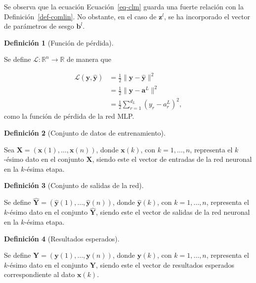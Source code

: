 \documentclass[
  us-letterpaper,
]{scrreprt}
\theoremstyle{plain}
\theoremstyle{definition}
\theoremstyle{plain}
\theoremstyle{definition}
\newtheorem{definition}{Definición}[chapter]
\theoremstyle{remark}
\begin{document}
Se observa que la ecuación Ecuación~\ref{eq-clm} guarda una fuerte
relación con la Definición~\ref{def-comlin}. No obstante, en el caso de
\(\mathbf{z}^l\), se ha incorporado el vector de parámetros de sesgo
\(\mathbf{b}^l\).

\begin{definition}[Función de
pérdida]\protect\hypertarget{def-fperdida}{}\label{def-fperdida}

Se define \(\mathcal L: \mathbb{R}^n \rightarrow \mathbb{R}\) de manera
que

\[\begin{split}\mathcal L(\mathbf y,\mathbf{\hat{y}}) &= \frac{1}{2}\|\mathbf y - \mathbf{\hat{y}}\|^2\\ &= \frac{1}{2} \|\mathbf y - \mathbf a^L\|^2\\ &= \frac{1}{2} \sum_{r=1}^{d_L} (y_r - a_r^L)^2,\end{split}\]
como la función de pérdida de la red MLP.

\end{definition}

\begin{definition}[Conjunto de datos de
entrenamiento]\protect\hypertarget{def-cde}{}\label{def-cde}

Sea \(\mathbf X = (\mathbf x(1), \ldots, \mathbf x(n))\), donde
\(\mathbf x(k)\), con \(k = 1, \ldots, n\), representa el \(k\)-ésimo
dato en el conjunto \(\mathbf X\), siendo este el vector de entradas de
la red neuronal en la \(k\)-ésima etapa.

\end{definition}

\begin{definition}[Conjunto de salidas de la
red]\protect\hypertarget{def-csr}{}\label{def-csr}

Se define
\(\hat{\mathbf Y} = (\hat{\mathbf y}(1), \ldots, \hat{\mathbf y}(n))\),
donde \(\hat{\mathbf y}(k)\), con \(k = 1, \ldots, n\), representa el
\(k\)-ésimo dato en el conjunto \(\hat{\mathbf Y}\), siendo este el
vector de salidas de la red neuronal en la \(k\)-ésima etapa.

\end{definition}

\begin{definition}[Resultados
esperados]\protect\hypertarget{def-re}{}\label{def-re}

Se define \(\mathbf Y = (\mathbf y(1), \ldots, \mathbf y(n))\), donde
\(\mathbf y(k)\), con \(k = 1, \ldots, n\), representa el \(k\)-ésimo
dato en el conjunto \(\mathbf Y\), siendo este el vector de resultados
esperados correspondiente al dato \(\mathbf x(k)\).

\end{definition}
\end{document}
